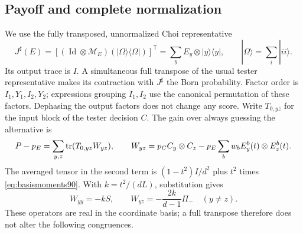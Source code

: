 \subsection{Payoff and complete normalization}
We use the fully transposed, unnormalized Choi representative
\begin{equation}\label{eq:choiconvention90}
 J^\sharp(E)=\left[(\operatorname{Id}\otimes\mathcal M_E)
          (|\Omega\rangle\langle\Omega|)\right]^{\mathsf T}
       =\sum_y E_y\otimes|y\rangle\langle y|,
 \qquad |\Omega\rangle=\sum_i|ii\rangle.
\end{equation}
Its output trace is $I$.  A simultaneous full transpose of the usual
tester representative makes its contraction with $J^\sharp$ the Born
probability.  Factor order is $I_1,Y_1,I_2,Y_2$; expressions grouping
$I_1,I_2$ use the canonical permutation of these factors.
Dephasing the output factors does not change any score.  Write $T_{0,yz}$
for the input block of the tester decision $C$.  The gain over always
guessing the alternative is
\begin{equation}\label{eq:payoff90}
 P-p_E=\sum_{y,z}\operatorname{tr}(T_{0,yz}W_{yz}),\qquad
 W_{yz}=p_C C_y\otimes C_z-p_E\sum_b w_b E_y^b(t)\otimes E_z^b(t).
\end{equation}
The averaged tensor in the second term is $(1-t^2)I/d^2$ plus $t^2$
times \eqref{eq:basismoments90}.  With $k=t^2/(dL)$, substitution gives
\begin{equation}\label{eq:payoffblocks90}
 W_{yy}=-kS,\qquad W_{yz}=-\frac{2k}{d-1}\Pi_-\quad(y\ne z).
\end{equation}
These operators are real in the coordinate basis; a full transpose
therefore does not alter the following congruences.

